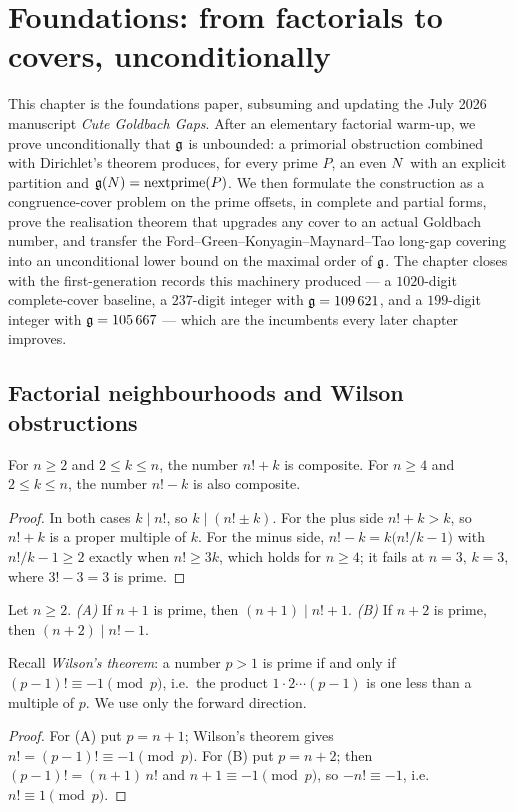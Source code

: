 \chapter{Foundations: from factorials to covers, unconditionally}
\label{ch:foundations}

\begin{chapterabstract}
This chapter is the foundations paper, subsuming and updating the July
2026 manuscript \emph{Cute Goldbach Gaps}. After an elementary factorial
warm-up, we prove unconditionally that $\mathfrak{g}$ is unbounded: a primorial
obstruction combined with Dirichlet's theorem produces, for every prime
$P$, an even $N$ with an explicit partition and
$\mathfrak{g}(N)=\mathrm{nextprime}(P)$. We then formulate the construction as a
congruence-cover problem on the prime offsets, in complete and partial
forms, prove the realisation theorem that upgrades any cover to an
actual Goldbach number, and transfer the
Ford--Green--Konyagin--Maynard--Tao long-gap covering into an
unconditional lower bound on the maximal order of $\mathfrak{g}$. The chapter
closes with the first-generation records this machinery produced --- a
$1020$-digit complete-cover baseline, a $237$-digit integer with
$\mathfrak{g}=109\,621$, and a $199$-digit integer with $\mathfrak{g}=105\,667$ --- which are
the incumbents every later chapter improves.
\end{chapterabstract}

\section{Factorial neighbourhoods and Wilson obstructions}\label{sec:factorial}

\begin{lemma}\label{lem:fact}
For $n\ge2$ and $2\le k\le n$, the number $n!+k$ is composite. For
$n\ge4$ and $2\le k\le n$, the number $n!-k$ is also composite.
\end{lemma}
\begin{proof}
In both cases $k\mid n!$, so $k\mid(n!\pm k)$. For the plus side
$n!+k>k$, so $n!+k$ is a proper multiple of $k$. For the minus side,
$n!-k=k\bigl(n!/k-1\bigr)$ with $n!/k-1\ge2$ exactly when $n!\ge3k$,
which holds for $n\ge4$; it fails at $n=3,\,k=3$, where $3!-3=3$ is
prime.
\end{proof}

\begin{lemma}\label{lem:wilson}
Let $n\ge2$. \emph{(A)} If $n+1$ is prime, then $(n+1)\mid n!+1$.
\emph{(B)} If $n+2$ is prime, then $(n+2)\mid n!-1$.
\end{lemma}
\noindent Recall \emph{Wilson's theorem}: a number $p>1$ is prime if and
only if $(p-1)!\equiv-1\pmod p$, i.e.\ the product $1\cdot2\cdots(p-1)$
is one less than a multiple of $p$. We use only the forward direction.
\begin{proof}
For (A) put $p=n+1$; Wilson's theorem gives $n!=(p-1)!\equiv-1\pmod p$.
For (B) put $p=n+2$; then $(p-1)!=(n+1)\,n!$ and $n+1\equiv-1\pmod p$,
so $-n!\equiv-1$, i.e.\ $n!\equiv1\pmod p$.
\end{proof}

